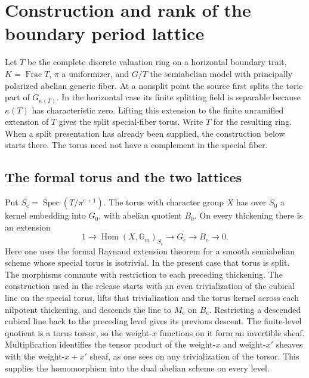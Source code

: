 \section{Construction and rank of the boundary period lattice}
\label{sec:boundary-periods}

Let \(T\) be the complete discrete valuation ring on a horizontal
boundary trait, \(K=\operatorname{Frac}T\), \(\pi\) a uniformizer, and
\(G/T\) the semiabelian model with principally polarized abelian
generic fiber. At a nonsplit point the source first splits the toric
part of \(G_{\kappa(T)}\). In the horizontal case its finite splitting
field is separable because \(\kappa(T)\) has characteristic zero.
Lifting this extension to the finite unramified extension of \(T\)
gives the split special-fiber torus. Write \(T\) for the resulting
ring. When a split presentation has already been supplied, the
construction below starts there. The torus need not have a
complement in the special fiber.

\subsection{The formal torus and the two lattices}

Put \(S_e=\operatorname{Spec}(T/\pi^{e+1})\). The torus with character
group \(X\) has over \(S_0\) a kernel embedding into \(G_0\), with
abelian quotient \(B_0\). On every thickening there is an extension
\[
  1\longrightarrow \operatorname{Hom}(X,\mathbb G_m)_{S_e}
  \longrightarrow G_e\longrightarrow B_e\longrightarrow 0.
\]
Here one uses the formal Raynaud extension theorem for a smooth
semiabelian scheme whose special torus is isotrivial. In the present
case that torus is split. The morphisms commute with restriction to
each preceding thickening. The construction used in the release starts
with an even trivialization of the cubical line on the special torus,
lifts that trivialization and the torus kernel across each nilpotent
thickening, and descends the line to \(M_e\) on \(B_e\). Restricting a
descended cubical line back to the preceding level gives its previous
descent. The finite-level quotient is a torus torsor, so the
weight-\(x\) functions on it form an invertible sheaf. Multiplication
identifies the tensor product of the weight-\(x\) and weight-\(x'\)
sheaves with the weight-\(x+x'\) sheaf, as one sees on any
trivialization of the torsor. This supplies the homomorphism into the
dual abelian scheme on every level.

